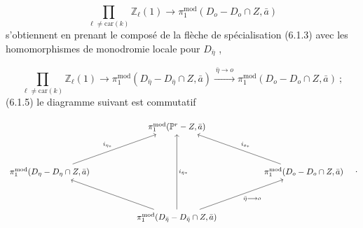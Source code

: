 \begin{equation*}
\prod_{\ell \neq \mathrm{car}(k)} \mathbb{Z}_{\ell}(1) \longrightarrow \pi_1^{\mathrm{mod}}(D_o - D_o \cap Z, \bar{a})
\end{equation*}
s'obtiennent en prenant le composé de la flèche de spécialisation (6.1.3) avec les homomorphismes de monodromie locale pour $D_{\bar{\eta}}$ ,

\begin{equation}\tag{6.1.4.1}
\prod_{\ell \neq \mathrm{car}(k)} \mathbb{Z}_{\ell}(1) \longrightarrow \pi_1^{\mathrm{mod}}(D_{\bar{\eta}} - D_{\bar{\eta}} \cap Z, \bar{a}) \xrightarrow{\ \bar{\eta} \longrightarrow o\ } \pi_1^{\mathrm{mod}}(D_o - D_o \cap Z, \bar{a}) \ ;
\end{equation}
(6.1.5) le diagramme suivant est commutatif

\begin{equation}\notag
\begin{tikzcd}[column sep=huge, row sep=huge]
 {} & \pi_1^{\mathrm{mod}}(\mathbb{P}^r-Z,\bar{a}) & {} \\
\pi_1^{\mathrm{mod}}(D_{\eta} - D_{\eta} \cap Z,\bar{a}) \arrow[ur, "i_{\eta_*}"] & {} & \pi_1^{\mathrm{mod}}(D_o - D_o \cap Z,\bar{a}) \arrow[ul, "i_{o_*}"'] \\
 {} & \pi_1^{\mathrm{mod}}(D_{\bar{\eta}} - D_{\bar{\eta}} \cap Z,\bar{a}) \arrow[uu, "i_{\bar{\eta}*}"'] \arrow[ul] \arrow[ur, "\bar{\eta} \longrightarrow o"'] &
{} \end{tikzcd} \quad .
\end{equation}

